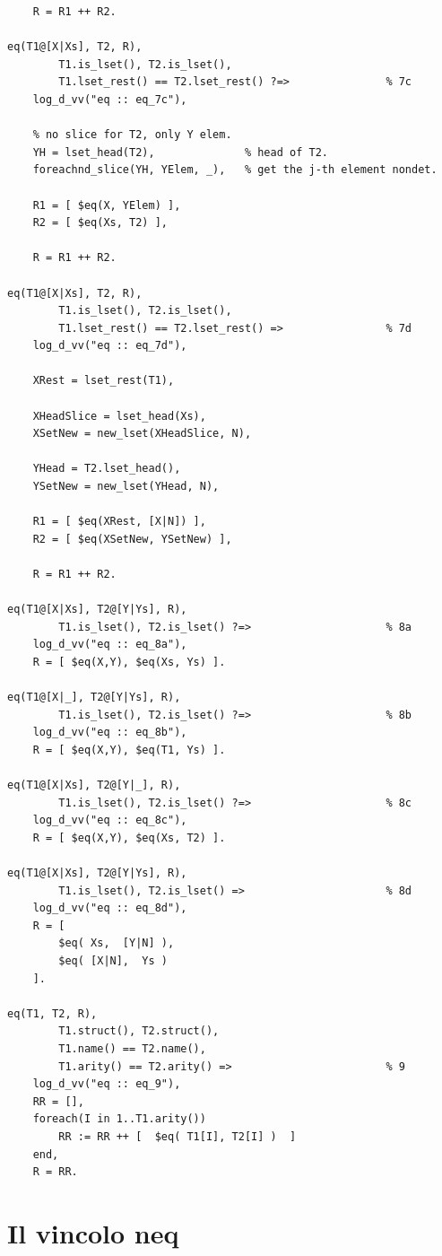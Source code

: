 \documentclass[12pt,a4paper,openright]{book}  %
\begin{document}
\begin{verbatim}
    R = R1 ++ R2.

eq(T1@[X|Xs], T2, R),
        T1.is_lset(), T2.is_lset(),
        T1.lset_rest() == T2.lset_rest() ?=>               % 7c
    log_d_vv("eq :: eq_7c"),

    % no slice for T2, only Y elem.
    YH = lset_head(T2),              % head of T2.
    foreachnd_slice(YH, YElem, _),   % get the j-th element nondet.

    R1 = [ $eq(X, YElem) ],
    R2 = [ $eq(Xs, T2) ],

    R = R1 ++ R2.

eq(T1@[X|Xs], T2, R),
        T1.is_lset(), T2.is_lset(),
        T1.lset_rest() == T2.lset_rest() =>                % 7d
    log_d_vv("eq :: eq_7d"),

    XRest = lset_rest(T1),

    XHeadSlice = lset_head(Xs),
    XSetNew = new_lset(XHeadSlice, N),

    YHead = T2.lset_head(),
    YSetNew = new_lset(YHead, N),

    R1 = [ $eq(XRest, [X|N]) ],
    R2 = [ $eq(XSetNew, YSetNew) ],

    R = R1 ++ R2.

eq(T1@[X|Xs], T2@[Y|Ys], R),
        T1.is_lset(), T2.is_lset() ?=>                     % 8a
    log_d_vv("eq :: eq_8a"),
    R = [ $eq(X,Y), $eq(Xs, Ys) ].

eq(T1@[X|_], T2@[Y|Ys], R),
        T1.is_lset(), T2.is_lset() ?=>                     % 8b
    log_d_vv("eq :: eq_8b"),
    R = [ $eq(X,Y), $eq(T1, Ys) ].

eq(T1@[X|Xs], T2@[Y|_], R),
        T1.is_lset(), T2.is_lset() ?=>                     % 8c
    log_d_vv("eq :: eq_8c"),
    R = [ $eq(X,Y), $eq(Xs, T2) ].

eq(T1@[X|Xs], T2@[Y|Ys], R),
        T1.is_lset(), T2.is_lset() =>                      % 8d
    log_d_vv("eq :: eq_8d"),
    R = [
        $eq( Xs,  [Y|N] ),
        $eq( [X|N],  Ys )
    ].

eq(T1, T2, R),
        T1.struct(), T2.struct(),
        T1.name() == T2.name(),
        T1.arity() == T2.arity() =>                        % 9
    log_d_vv("eq :: eq_9"),
    RR = [],
    foreach(I in 1..T1.arity())
        RR := RR ++ [  $eq( T1[I], T2[I] )  ]
    end,
    R = RR.
\end{verbatim}

\section{Il vincolo neq}
\end{document}
